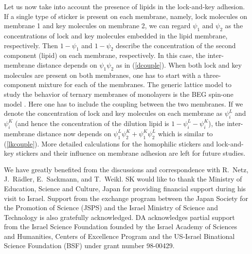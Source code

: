 Let us now take into account the presence of lipids
in the lock-and-key adhesion.
If a single type of sticker is present on each membrane, namely,
lock molecules on membrane 1 and key molecules on membrane 2, we
can regard $\psi_1$ and $\psi_2$ as the concentrations of lock and key
molecules embedded in the lipid membrane, respectively.
Then $1-\psi_1$ and $1-\psi_2$ describe the concentration of the
second component (lipid) on each membrane, respectively.
In this case, the inter-membrane distance depends on $\psi_1 \psi_2$ as
in (\ref{dcouple}).
When both lock and key molecules are present on both membranes, one has
to start with a three-component mixture for each of the membranes.
The generic lattice model to study the behavior of ternary membranes
of monolayers is the BEG spin-one model \cite{BEG,KC,KGL}.
Here one has to include the coupling between the two membranes.
If we denote the concentration of lock and key molecules on each membrane
as $\psi^L_i$ and $\psi^K_i$ (and hence the concentration of the dilution
lipid
is $1 -\psi^L_i -\psi^K_i$), the inter-membrane distance now depends on
$\psi^L_1 \psi^K_2 + \psi^K_1 \psi^L_2$ which is similar to
(\ref{lkcouple}).
More detailed calculations for the homophilic stickers and lock-and-key
stickers and their influence
on membrane adhesion are left for future studies.




\acknowledgments


We have greatly benefited from the discussions and correspondence
with R.\ Netz, J.\ R\"adler, E.\ Sackmann, and T.\ Weikl.
SK would like to thank the Ministry of Education, Science and
Culture, Japan for providing financial support during his visit to
Israel.
Support from the exchange program between the Japan Society for
the Promotion of Science (JSPS) and the Israel Ministry of Science and
Technology is also gratefully acknowledged.
DA acknowledges partial support from the Israel Science Foundation
founded by the Israel Academy of Sciences and Humanities, Centers
of Excellence Program and the US-Israel Binational Science Foundation
(BSF) under grant number 98-00429.




